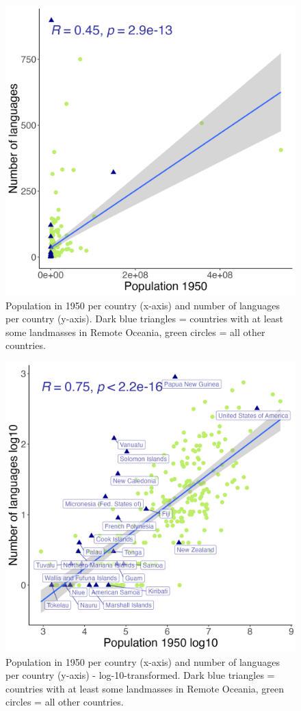 \documentclass[12pt,letterpaper]{article}
\begin{document}
\begin{figure}[ht]
    \centering
    \includegraphics[width=.8\linewidth]{number_of_languages_vs_pop_1950.png}
    \caption{Population in 1950 per country (x-axis) and number of languages per country (y-axis). Dark blue triangles = countries with at least some landmasses in Remote Oceania, green circles = all other countries.}
        \label{fig:un_pop_plot}
    \end{figure}
\begin{figure}[ht]
    \centering
          \includegraphics[width=.8\linewidth]{number_of_languages_vs_pop_1950_log10.png}
    \caption{Population in 1950 per country (x-axis) and number of languages per country (y-axis) - log-10-transformed. Dark blue triangles = countries with at least some landmasses in Remote Oceania, green circles = all other countries.}
    \label{fig:un_pop_plot_log10}
    \end{figure}
\end{document}
